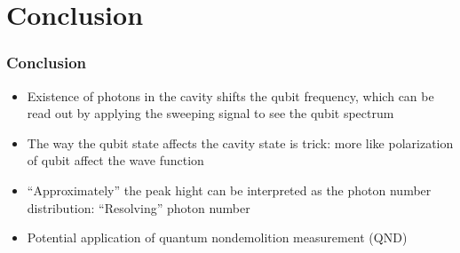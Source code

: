 \documentclass[xcolor=dvipsnames,hyperref={CJKbookmarks=true},aspectratio=169]{beamer}
\begin{document}
\begin{frame}[t]
\begin{columns}
\begin{column}{0.5\linewidth}
	\centering
\end{column}
\end{columns}
\end{frame}

\section{Conclusion}
\begin{frame}[t]\frametitle{Conclusion}
\begin{itemize}
	\item Existence of photons in the cavity shifts the qubit frequency, 
	which can be read out by applying the sweeping signal to see the qubit 
	spectrum
	\item The way the qubit state affects the cavity state is trick: more 
	like polarization of qubit affect the wave function\pause
	\vspace{10pt}
	\item ``Approximately'' the peak hight can be interpreted as the photon 
	number distribution: ``Resolving'' photon number
	\item Potential application of quantum nondemolition measurement (QND)
\end{itemize}
\end{frame}
\end{document}
